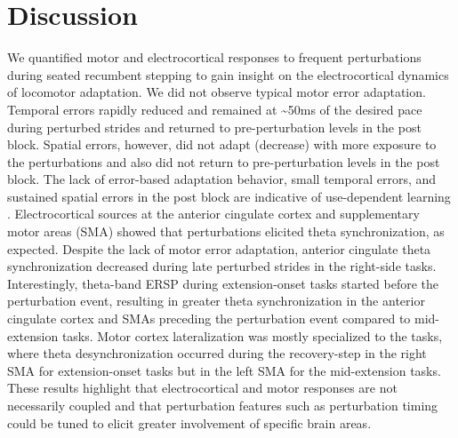 \documentclass[shortpaper,twoside,web]{ieeecolor}
\newcommand{\td}{\textasciitilde}
\begin{document}
\section{Discussion}
\label{sec:Discussion}

We quantified motor and electrocortical responses to frequent perturbations during seated recumbent stepping to gain insight on the electrocortical dynamics of locomotor adaptation. We did not observe typical motor error adaptation. Temporal errors rapidly reduced and remained at \td50ms of the desired pace during perturbed strides and returned to pre-perturbation levels in the post block. Spatial errors, however, did not adapt (decrease) with more exposure to the perturbations and also did not return to pre-perturbation levels in the post block. The lack of error-based adaptation behavior, small temporal errors, and sustained spatial errors in the post block are indicative of use-dependent learning \cite{Diedrichsen2010-as}. Electrocortical sources at the anterior cingulate cortex and supplementary motor areas (SMA) showed that perturbations elicited theta synchronization, as expected. Despite the lack of motor error adaptation, anterior cingulate theta synchronization decreased during late perturbed strides in the right-side tasks. Interestingly, theta-band ERSP during extension-onset tasks started before the perturbation event, resulting in greater theta synchronization in the anterior cingulate cortex and SMAs preceding the perturbation event compared to mid-extension tasks. Motor cortex lateralization was mostly specialized to the tasks, where theta desynchronization occurred during the recovery-step in the right SMA for extension-onset tasks but in the left SMA for the mid-extension tasks. These results highlight that electrocortical and motor responses are not necessarily coupled and that perturbation features such as perturbation timing could be tuned to elicit greater involvement of specific brain areas.
\end{document}
